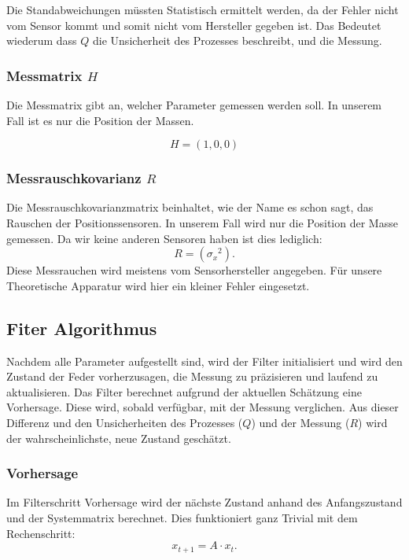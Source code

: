Die Standabweichungen müssten Statistisch ermittelt werden, da der Fehler nicht vom Sensor kommt und somit nicht vom Hersteller gegeben ist. Das Bedeutet wiederum dass $Q$ die Unsicherheit des Prozesses beschreibt, und die Messung. 

\subsubsection*{Messmatrix $H$}
Die Messmatrix gibt an, welcher Parameter gemessen werden soll. In unserem Fall ist es nur die Position der Massen. 

\[ H = (1, 0, 0) \]


\subsubsection*{Messrauschkovarianz $R$}
Die Messrauschkovarianzmatrix beinhaltet, wie der Name es schon sagt, das Rauschen der Positionssensoren. In unserem Fall wird nur die Position der Masse gemessen. Da wir keine anderen Sensoren haben ist dies lediglich:
\begin{equation}
R= ({\sigma_x}^2).
\end{equation} 
Diese Messrauchen wird meistens vom Sensorhersteller angegeben. Für unsere Theoretische Apparatur wird hier ein kleiner Fehler eingesetzt.

\subsection{Fiter Algorithmus}
Nachdem alle Parameter aufgestellt sind, wird der Filter initialisiert und wird den Zustand der Feder vorherzusagen, die Messung zu präzisieren und laufend zu aktualisieren. Das Filter berechnet aufgrund der aktuellen Schätzung eine Vorhersage. Diese wird, sobald verfügbar, mit der Messung verglichen. Aus dieser Differenz und den Unsicherheiten des Prozesses ($Q$) und der Messung ($R$) wird der wahrscheinlichste, neue Zustand geschätzt.


\subsubsection*{Vorhersage}
Im Filterschritt Vorhersage wird der nächste Zustand anhand des Anfangszustand und der Systemmatrix berechnet. Dies funktioniert ganz Trivial mit dem Rechenschritt:
\begin{equation}
{x_{t+1}}=A\cdot{x_t}.
\end{equation} 


